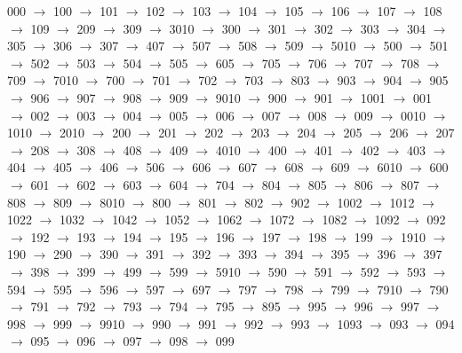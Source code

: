 000 $\rightarrow$ 100 $\rightarrow$ 101 $\rightarrow$ 102 $\rightarrow$ 103 $\rightarrow$ 104 $\rightarrow$ 105 $\rightarrow$ 106 $\rightarrow$ 107 $\rightarrow$ 108 $\rightarrow$ 109 $\rightarrow$ 209 $\rightarrow$ 309 $\rightarrow$ 3010 $\rightarrow$ 300 $\rightarrow$ 301 $\rightarrow$ 302 $\rightarrow$ 303 $\rightarrow$ 304 $\rightarrow$ 305 $\rightarrow$ 306 $\rightarrow$ 307 $\rightarrow$ 407 $\rightarrow$ 507 $\rightarrow$ 508 $\rightarrow$ 509 $\rightarrow$ 5010 $\rightarrow$ 500 $\rightarrow$ 501 $\rightarrow$ 502 $\rightarrow$ 503 $\rightarrow$ 504 $\rightarrow$ 505 $\rightarrow$ 605 $\rightarrow$ 705 $\rightarrow$ 706 $\rightarrow$ 707 $\rightarrow$ 708 $\rightarrow$ 709 $\rightarrow$ 7010 $\rightarrow$ 700 $\rightarrow$ 701 $\rightarrow$ 702 $\rightarrow$ 703 $\rightarrow$ 803 $\rightarrow$ 903 $\rightarrow$ 904 $\rightarrow$ 905 $\rightarrow$ 906 $\rightarrow$ 907 $\rightarrow$ 908 $\rightarrow$ 909 $\rightarrow$ 9010 $\rightarrow$ 900 $\rightarrow$ 901 $\rightarrow$ 1001 $\rightarrow$ 001 $\rightarrow$ 002 $\rightarrow$ 003 $\rightarrow$ 004 $\rightarrow$ 005 $\rightarrow$ 006 $\rightarrow$ 007 $\rightarrow$ 008 $\rightarrow$ 009 $\rightarrow$ 0010 $\rightarrow$ 1010 $\rightarrow$ 2010 $\rightarrow$ 200 $\rightarrow$ 201 $\rightarrow$ 202 $\rightarrow$ 203 $\rightarrow$ 204 $\rightarrow$ 205 $\rightarrow$ 206 $\rightarrow$ 207 $\rightarrow$ 208 $\rightarrow$ 308 $\rightarrow$ 408 $\rightarrow$ 409 $\rightarrow$ 4010 $\rightarrow$ 400 $\rightarrow$ 401 $\rightarrow$ 402 $\rightarrow$ 403 $\rightarrow$ 404 $\rightarrow$ 405 $\rightarrow$ 406 $\rightarrow$ 506 $\rightarrow$ 606 $\rightarrow$ 607 $\rightarrow$ 608 $\rightarrow$ 609 $\rightarrow$ 6010 $\rightarrow$ 600 $\rightarrow$ 601 $\rightarrow$ 602 $\rightarrow$ 603 $\rightarrow$ 604 $\rightarrow$ 704 $\rightarrow$ 804 $\rightarrow$ 805 $\rightarrow$ 806 $\rightarrow$ 807 $\rightarrow$ 808 $\rightarrow$ 809 $\rightarrow$ 8010 $\rightarrow$ 800 $\rightarrow$ 801 $\rightarrow$ 802 $\rightarrow$ 902 $\rightarrow$ 1002 $\rightarrow$ 1012 $\rightarrow$ 1022 $\rightarrow$ 1032 $\rightarrow$ 1042 $\rightarrow$ 1052 $\rightarrow$ 1062 $\rightarrow$ 1072 $\rightarrow$ 1082 $\rightarrow$ 1092 $\rightarrow$ 092 $\rightarrow$ 192 $\rightarrow$ 193 $\rightarrow$ 194 $\rightarrow$ 195 $\rightarrow$ 196 $\rightarrow$ 197 $\rightarrow$ 198 $\rightarrow$ 199 $\rightarrow$ 1910 $\rightarrow$ 190 $\rightarrow$ 290 $\rightarrow$ 390 $\rightarrow$ 391 $\rightarrow$ 392 $\rightarrow$ 393 $\rightarrow$ 394 $\rightarrow$ 395 $\rightarrow$ 396 $\rightarrow$ 397 $\rightarrow$ 398 $\rightarrow$ 399 $\rightarrow$ 499 $\rightarrow$ 599 $\rightarrow$ 5910 $\rightarrow$ 590 $\rightarrow$ 591 $\rightarrow$ 592 $\rightarrow$ 593 $\rightarrow$ 594 $\rightarrow$ 595 $\rightarrow$ 596 $\rightarrow$ 597 $\rightarrow$ 697 $\rightarrow$ 797 $\rightarrow$ 798 $\rightarrow$ 799 $\rightarrow$ 7910 $\rightarrow$ 790 $\rightarrow$ 791 $\rightarrow$ 792 $\rightarrow$ 793 $\rightarrow$ 794 $\rightarrow$ 795 $\rightarrow$ 895 $\rightarrow$ 995 $\rightarrow$ 996 $\rightarrow$ 997 $\rightarrow$ 998 $\rightarrow$ 999 $\rightarrow$ 9910 $\rightarrow$ 990 $\rightarrow$ 991 $\rightarrow$ 992 $\rightarrow$ 993 $\rightarrow$ 1093 $\rightarrow$ 093 $\rightarrow$ 094 $\rightarrow$ 095 $\rightarrow$ 096 $\rightarrow$ 097 $\rightarrow$ 098 $\rightarrow$ 099 